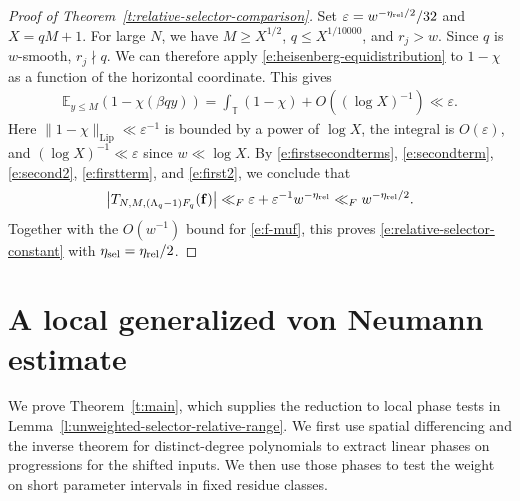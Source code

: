 \documentclass[12pt]{amsart}
\newcommand{\1}{\mathbf 1}
\theoremstyle{definition}
\begin{document}
\begin{proof}[Proof of Theorem~\ref{t:relative-selector-comparison}]
Set \(\varepsilon=w^{-\eta_{\rm rel}/2}/32\) and \(X=qM+1\).
For large \(N\), we have \(M\ge X^{1/2}\), \(q\le X^{1/10000}\),
and \(r_j>w\). Since \(q\) is \(w\)-smooth, \(r_j\nmid q\).
We can therefore apply \eqref{e:heisenberg-equidistribution}
to \(1-\chi\) as a function of the horizontal coordinate. This gives
\begin{align}\label{e:first2}
    \mathbb E_{y\le M}(1-\chi(\beta qy))
 =\int_{\mathbb T}(1-\chi)+O((\log X)^{-1})
 \ll\varepsilon.
\end{align}
Here \(\|1-\chi\|_{\mathrm{Lip}}\ll\varepsilon^{-1}\) is bounded
by a power of \(\log X\), the integral is \(O(\varepsilon)\),
and \((\log X)^{-1}\ll\varepsilon\) since \(w\ll\log X\). By \eqref{e:firstsecondterms}, \eqref{e:secondterm}, \eqref{e:second2}, \eqref{e:firstterm}, and \eqref{e:first2}, we conclude that
\[
 \bigl|T_{N,M,(\Lambda_q-1)F_q}(\mathbf f)\bigr|
 \ll_F \varepsilon+\varepsilon^{-1}w^{-\eta_{\rm rel}}
 \ll_F w^{-\eta_{\rm rel}/2}.
\]
Together with the \(O(w^{-1})\) bound for \eqref{e:f-muf}, this proves \eqref{e:relative-selector-constant}
with \(\eta_{\rm sel}=\eta_{\rm rel}/2\).
\end{proof}

\section{A local generalized von Neumann estimate}\label{s:local-vn}

We prove Theorem~\ref{t:main}, which supplies the reduction to
local phase tests in Lemma~\ref{l:unweighted-selector-relative-range}.
We first use spatial differencing and the inverse theorem for
distinct-degree polynomials to extract linear phases on
progressions for the shifted inputs. We then use those phases to
test the weight on short parameter intervals in fixed residue
classes. 
\end{document}
